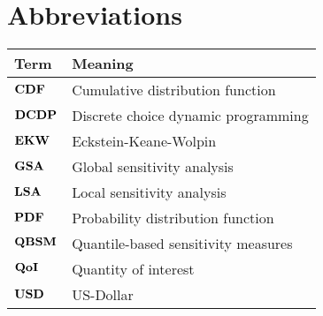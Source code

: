 

\section*{Abbreviations} %
\thispagestyle{plain} %

\phantom{This text will be invisible}
\hspace{20cm}



\begin{table}[H]
	\centering
	\renewcommand{\arraystretch}{1.2}%
	\begin{tabular}{@{}ll@{}}
		\toprule
	Term\phantom{space}	& Meaning \\ \midrule
	$\bold{CDF}$	& Cumulative distribution function \\
	$\bold{DCDP}$	& Discrete choice dynamic programming  \\
	$\bold{EKW}$	& Eckstein-Keane-Wolpin  \\
	$\bold{GSA}$	& Global sensitivity analysis \\
	$\bold{LSA}$	& Local sensitivity analysis \\
	$\bold{PDF}$	& Probability distribution function \\
	$\bold{QBSM}$	& Quantile-based sensitivity measures \\
    $\bold{QoI}$	& Quantity of interest \\
    $\bold{USD}$	& US-Dollar  \\
 \bottomrule
	\end{tabular}
\end{table}
